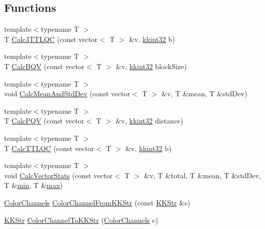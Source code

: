 \subsection*{Functions}
\begin{DoxyCompactItemize}
\item 
{\footnotesize template$<$typename T $>$ }\\T \hyperlink{namespace_k_k_b_aa5abbf4953488965fbc199273766b677}{Calc3\+T\+T\+L\+QC} (const vector$<$ T $>$ \&v, \hyperlink{namespace_k_k_b_a8fa4952cc84fda1de4bec1fbdd8d5b1b}{kkint32} b)
\item 
{\footnotesize template$<$typename T $>$ }\\T \hyperlink{namespace_k_k_b_a3406810c17d9155ef5b1ea26cdce4e34}{Calc\+B\+QV} (const vector$<$ T $>$ \&v, \hyperlink{namespace_k_k_b_a8fa4952cc84fda1de4bec1fbdd8d5b1b}{kkint32} block\+Size)
\item 
{\footnotesize template$<$typename T $>$ }\\void \hyperlink{namespace_k_k_b_ae94c8e8f87b5d40ee3eeeb06cf4cf15c}{Calc\+Mean\+And\+Std\+Dev} (const vector$<$ T $>$ \&v, T \&mean, T \&std\+Dev)
\item 
{\footnotesize template$<$typename T $>$ }\\T \hyperlink{namespace_k_k_b_a3e0b84498f93ccd1aeea66e35694f647}{Calc\+P\+QV} (const vector$<$ T $>$ \&v, \hyperlink{namespace_k_k_b_a8fa4952cc84fda1de4bec1fbdd8d5b1b}{kkint32} distance)
\item 
{\footnotesize template$<$typename T $>$ }\\T \hyperlink{namespace_k_k_b_a2fec8adca6f747b814095504a702e055}{Calc\+T\+T\+L\+QC} (const vector$<$ T $>$ \&v, \hyperlink{namespace_k_k_b_a8fa4952cc84fda1de4bec1fbdd8d5b1b}{kkint32} b)
\item 
{\footnotesize template$<$typename T $>$ }\\void \hyperlink{namespace_k_k_b_a9aea5021916240d7d3bb1b8548d0eea2}{Calc\+Vector\+Stats} (const vector$<$ T $>$ \&v, T \&total, T \&mean, T \&std\+Dev, T \&\hyperlink{_usf_cas_cor_8h_a8195a86b6d75b9a3939505e8bb50021e}{min}, T \&\hyperlink{_usf_cas_cor_8h_ab95f7757e11b270d27b95ec0d8e798b5}{max})
\item 
\hyperlink{namespace_k_k_b_a91743d17eafa05c7ff4e08017ac2b718}{Color\+Channels} \hyperlink{namespace_k_k_b_aa0cfae147b55931c0f0710d1a8c6ae68}{Color\+Channel\+From\+K\+K\+Str} (const \hyperlink{class_k_k_b_1_1_k_k_str}{K\+K\+Str} \&s)
\item 
\hyperlink{class_k_k_b_1_1_k_k_str}{K\+K\+Str} \hyperlink{namespace_k_k_b_a97094dfff18985dad35d066bbabc3c69}{Color\+Channel\+To\+K\+K\+Str} (\hyperlink{namespace_k_k_b_a91743d17eafa05c7ff4e08017ac2b718}{Color\+Channels} c)

\end{DoxyCompactItemize}

